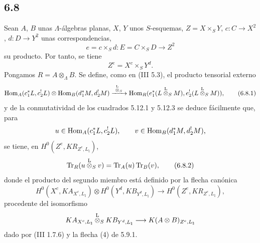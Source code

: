 \subsection*{6.8}
Sean $A$, $B$ unas $\Lambda$-álgebras planas, $X$, $Y$ unos $S$-esquemas, $Z=X\times_SY$, $c:C\to X^2$, $d:D\to Y^2$ unas correspondencias,
\[
e=c\times_Sd:E=C\times_SD\longrightarrow Z^2
\]
su producto. Por tanto, se tiene
\[
Z^e=X^c\times_SY^d.
\]
Pongamos $R=A\otimes_{\Lambda}B$. Se define, como en (III 5.3), el producto tensorial externo
\begin{equation}
\operatorname{Hom}_A(c_1^*L,c_2^!L)\otimes \operatorname{Hom}_B(d_1^*M,d_2^!M)
\xrightarrow{\ \overset{\mathrm L}{\otimes}_S\ }
\operatorname{Hom}_R(e_1^*(L\overset{\mathrm L}{\otimes}_SM),e_2^!(L\overset{\mathrm L}{\otimes}_SM)),
\tag{6.8.1}
\end{equation}
y de la conmutatividad de los cuadrados 5.12.1 y 5.12.3 se deduce fácilmente que, para
\[
u\in\operatorname{Hom}_A(c_1^*L,c_2^!L),\qquad v\in\operatorname{Hom}_B(d_1^*M,d_2^!M),
\]
se tiene, en $H^0(Z^e,KR_{Z^e,L_{\natural}})$,
\begin{equation}
\operatorname{Tr}_R(u\overset{\mathrm L}{\otimes}_Sv)=\operatorname{Tr}_A(u)\operatorname{Tr}_B(v),
\tag{6.8.2}
\end{equation}
donde el producto del segundo miembro está definido por la flecha canónica
\begin{equation}
H^0(X^c,KA_{X^c,L_{\natural}})\otimes
H^0(Y^d,KB_{Y^d,L_{\natural}})
\longrightarrow
H^0(Z^e,KR_{Z^e,L_{\natural}}),
\tag{6.8.3}
\end{equation}
procedente del isomorfismo
\[
KA_{X^c,L_{\natural}}\overset{\mathrm L}{\otimes}_S KB_{Y^d,L_{\natural}}\longrightarrow K(A\otimes B)_{Z^e,L_{\natural}}
\]
dado por (III 1.7.6) y la flecha (4) de 5.9.1.
